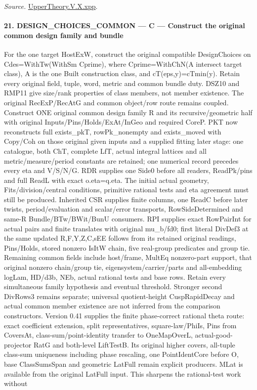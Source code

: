 \emph{Source.} \href{https://github.com/CocoSgt/riemann-hypothesis-lean/blob/7cbf7a0c32fca1badf05931879a37c3f8a2b03b4/src/Development/AutomorphicArithmetic/AutomorphicVarieties/LevelCohomology/Xpp.lean#L11-L84}{UpperTheory.V.X.xpp}.



\paragraph{21. DESIGN\_\allowbreak CHOICES\_\allowbreak COMMON — C — Construct the original common design family and bundle}

For the one target HostExW, construct the original compatible DesignChoices on Cdes=WithTw(WithSm Cprime), where Cprime=WithChN(A intersect target class), A is the one Built construction class, and cT(eps,y)=cTmin(y). Retain every original field, tuple, word, metric and common bundle duty. DSZ10 and RMP11 give size/rank properties of class members, not member existence. The original RecExP/RecAtG and common object/row route remains coupled. Construct ONE original common design family R and its recursive/geometric half with original Inputs/Pins/Holds/ExAt/InGeo and required CoreP. PKT now reconstructs full exists\_\allowbreak pkT, rowPk\_\allowbreak nonempty and exists\_\allowbreak moved with Copy/Coh on those original given inputs and a supplied fitting later stage: one catalogue, both ChT, complete LfT, actual integral lattices and all metric/measure/period constants are retained; one numerical record precedes every eta and V/S/N/G. RDR supplies one Side0 before all readers, ReadPk/pins and full ReadL with exact o.eta=q.eta. The initial actual geometry, Fits/division/central conditions, primitive rational tests and eta agreement must still be produced. Inherited CSR supplies finite columns, one ReadC before later twists, period/evaluation and scalar/error transports, RowSideDetermined and same-R Bundle/BTw/BWit/BunU consumers. RPI supplies exact RowPairInt for actual pairs and finite translates with original mu\_\allowbreak b/fd0; first literal DivDef3 at the same updated R,F,Y,Z,C,sEE follows from its retained original readings, Pins/Holds, stored nonzero IsItW chain, five real-group predicates and group tie. Remaining common fields include host/frame, MultEq nonzero-part support, that original nonzero chain/group tie, eigensystem/carrier/parts and all-embedding logLam, HD/d3b, NEb, actual rational tests and base rows. Retain every simultaneous family hypothesis and eventual threshold. Stronger second DivRows3 remains separate; universal quotient-height CuspRapidDecay and actual common member existence are not inferred from the comparison constructors. Version 0.41 supplies the finite phase-correct rational theta route: exact coefficient extension, split representatives, square-law/PhiIs, Pins from CoversAt, class-sum/point-identity transfer to OneMapOverL, actual-good-projector RatG and both-level LiftTestB. Its original higher covers, all-tuple class-sum uniqueness including phase rescaling, one PointIdentCore before O, base ClassSumsSpan and geometric LatFull remain explicit producers. MLat is available from the original LatFull input. This sharpens the rational-test work without 